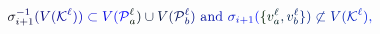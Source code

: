 \documentclass[12pt]{article}
\begin{document}
\makeatletter
\renewcommand*{\@textcolor}[3]{%
  \protect\leavevmode
  \begingroup
    \color#1{#2}#3%
  \endgroup
}
\makeatother
\begin{displaymath}
\mathcolor[RGB]{0,0,15}{\sigma} _ { \mathcolor[RGB]{0,0,30}{i} \mathcolor[RGB]{0,0,45}{+} \mathcolor[RGB]{0,0,60}{1} } ^ { \mathcolor[RGB]{0,0,75}{-} \mathcolor[RGB]{0,0,90}{1} } \mathcolor[RGB]{0,0,105}{(} \mathcolor[RGB]{0,0,120}{V} \mathcolor[RGB]{0,0,135}{(} \mathcal { \mathcolor[RGB]{0,0,150}{K} } ^ { \mathcolor[RGB]{0,0,165}{\ell} } \mathcolor[RGB]{0,0,180}{)} \mathcolor[RGB]{0,0,195}{)} \mathcolor[RGB]{0,0,210}{\subset} \mathcolor[RGB]{0,0,225}{V} \mathcolor[RGB]{0,0,240}{(} \mathcal { \mathcolor[RGB]{0,0,255}{P} } _ { \mathcolor[RGB]{0,15,0}{a} } ^ { \mathcolor[RGB]{0,15,15}{\ell} } \mathcolor[RGB]{0,15,30}{)} \mathcolor[RGB]{0,15,45}{\cup} \mathcolor[RGB]{0,15,60}{V} \mathcolor[RGB]{0,15,75}{(} \mathcal { \mathcolor[RGB]{0,15,90}{P} } _ { \mathcolor[RGB]{0,15,105}{b} } ^ { \mathcolor[RGB]{0,15,120}{\ell} } \mathcolor[RGB]{0,15,135}{)} \mathrm { ~ \mathcolor[RGB]{0,15,150}{a} \mathcolor[RGB]{0,15,165}{n} \mathcolor[RGB]{0,15,180}{d} ~ } \mathcolor[RGB]{0,15,195}{\sigma} _ { \mathcolor[RGB]{0,15,210}{i} \mathcolor[RGB]{0,15,225}{+} \mathcolor[RGB]{0,15,240}{1} } \mathcolor[RGB]{0,15,255}{(} \mathcolor[RGB]{0,30,0}{\{} \mathcolor[RGB]{0,30,15}{v} _ { \mathcolor[RGB]{0,30,30}{a} } ^ { \mathcolor[RGB]{0,30,45}{\ell} } \mathcolor[RGB]{0,30,60}{,} \mathcolor[RGB]{0,30,75}{v} _ { \mathcolor[RGB]{0,30,90}{b} } ^ { \mathcolor[RGB]{0,30,105}{\ell} } \mathcolor[RGB]{0,30,120}{\}} \mathcolor[RGB]{0,30,135}{)} \mathcolor[RGB]{0,30,150}{\not\subset} \mathcolor[RGB]{0,30,165}{V} \mathcolor[RGB]{0,30,180}{(} \mathcal { \mathcolor[RGB]{0,30,195}{K} } ^ { \mathcolor[RGB]{0,30,210}{\ell} } \mathcolor[RGB]{0,30,225}{)} \mathcolor[RGB]{0,30,240}{,}
\end{displaymath}
\end{document}
